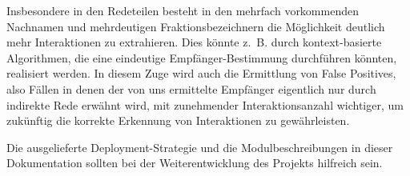 Insbesondere in den Redeteilen besteht in den mehrfach vorkommenden Nachnamen
und mehrdeutigen Fraktionsbezeichnern die Möglichkeit deutlich mehr
Interaktionen zu extrahieren. Dies könnte z.~B. durch kontext-basierte
Algorithmen, die eine eindeutige Empfänger-Bestimmung durchführen könnten,
realisiert werden. In diesem Zuge wird auch die Ermittlung von False Positives,
also Fällen in denen der von uns ermittelte Empfänger eigentlich nur durch
indirekte Rede erwähnt wird, mit zunehmender Interaktionsanzahl wichtiger, um
zukünftig die korrekte Erkennung von Interaktionen zu gewährleisten.

Die ausgelieferte Deployment-Strategie und die Modulbeschreibungen in dieser
Dokumentation sollten bei der Weiterentwicklung des Projekts hilfreich sein.